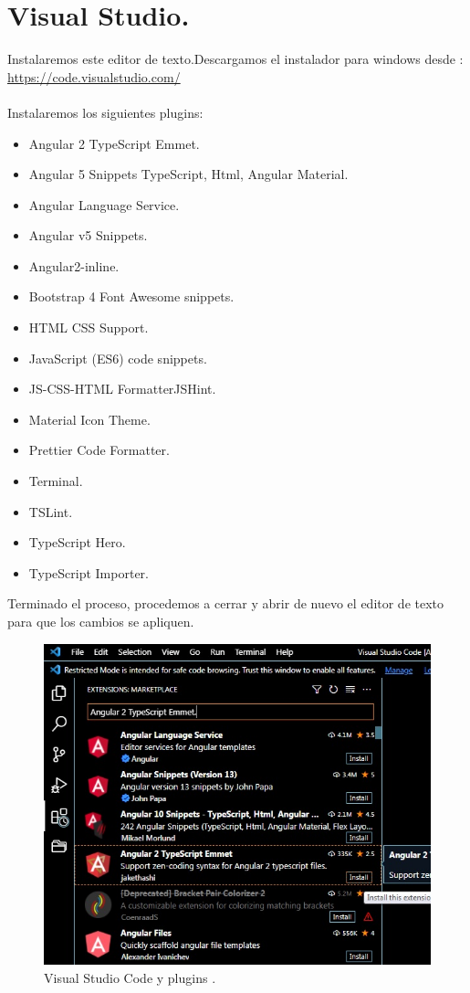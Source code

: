 \section{Visual Studio.}
Instalaremos  este editor de texto.Descargamos el instalador para windows desde :\\
\url{https://code.visualstudio.com/}\\\\
Instalaremos los siguientes plugins:
\begin{itemize}
	\item Angular 2 TypeScript Emmet.
	\item Angular 5 Snippets TypeScript, Html, Angular Material.
	\item Angular Language Service.
	\item Angular v5 Snippets.
	\item Angular2-inline.
	\item Bootstrap 4 Font Awesome snippets.
	\item HTML CSS Support.
	\item JavaScript (ES6) code snippets.
	\item JS-CSS-HTML FormatterJSHint.
	\item Material Icon Theme.
	\item Prettier Code Formatter.
	\item Terminal.
	\item TSLint.
	\item TypeScript Hero.
	\item TypeScript Importer.
\end{itemize}
Terminado el proceso, procedemos a cerrar y abrir de nuevo el editor de texto para que los cambios se apliquen.
\begin{figure}[H] %
	\centering %
	\includegraphics[scale=0.7]{images/c1_6.jpg}
	\caption{Visual Studio Code y plugins .}
\end{figure}








